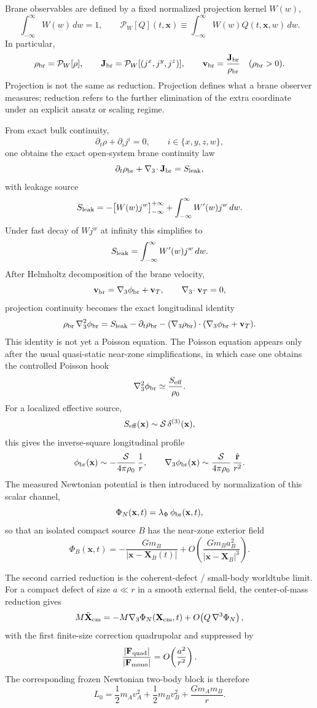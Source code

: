 \documentclass[11pt]{article}
\begin{document}
Brane observables are defined by a fixed normalized projection kernel $W(w)$,
\[
\int_{-\infty}^{\infty}W(w)\,dw=1,
\qquad
\mathcal P_W[Q](t,\mathbf x)
\equiv
\int_{-\infty}^{\infty}W(w)Q(t,\mathbf x,w)\,dw.
\]
In particular,
\[
\rho_{\rm br}=\mathcal P_W[\rho],
\qquad
\mathbf J_{\rm br}=\mathcal P_W[(j^x,j^y,j^z)],
\qquad
\mathbf v_{\rm br}=\frac{\mathbf J_{\rm br}}{\rho_{\rm br}}
\quad (\rho_{\rm br}>0).
\]
Projection is not the same as reduction.  Projection defines what a brane observer
measures; reduction refers to the further elimination of the extra coordinate under an
explicit ansatz or scaling regime.

From exact bulk continuity,
\[
\partial_t\rho+\partial_i j^i=0,
\qquad i\in\{x,y,z,w\},
\]
one obtains the exact open-system brane continuity law
\[
\partial_t\rho_{\rm br}+\nabla_3\!\cdot\mathbf J_{\rm br}=S_{\rm leak},
\]
with leakage source
\[
S_{\rm leak}
=
-\bigl[W(w)j^w\bigr]_{-\infty}^{+\infty}
+
\int_{-\infty}^{\infty}W'(w)j^w\,dw.
\]
Under fast decay of $Wj^w$ at infinity this simplifies to
\[
S_{\rm leak}
=
\int_{-\infty}^{\infty}W'(w)j^w\,dw.
\]
After Helmholtz decomposition of the brane velocity,
\[
\mathbf v_{\rm br}=\nabla_3\phi_{\rm br}+\mathbf v_T,
\qquad
\nabla_3\!\cdot\mathbf v_T=0,
\]
projection continuity becomes the exact longitudinal identity
\[
\rho_{\rm br}\,\nabla_3^2\phi_{\rm br}
=
S_{\rm leak}
-\partial_t\rho_{\rm br}
-(\nabla_3\rho_{\rm br})\cdot(\nabla_3\phi_{\rm br}+\mathbf v_T).
\]
This identity is not yet a Poisson equation.  The Poisson equation appears only after the
usual quasi-static near-zone simplifications, in which case one obtains the controlled
Poisson hook
\[
\nabla_3^2\phi_{\rm br}\simeq \frac{S_{\rm eff}}{\rho_0}.
\]
For a localized effective source,
\[
S_{\rm eff}(\mathbf x)\sim \mathcal S\,\delta^{(3)}(\mathbf x),
\]
this gives the inverse-square longitudinal profile
\[
\phi_{\rm br}(\mathbf x)
\sim
-\frac{\mathcal S}{4\pi\rho_0}\,\frac{1}{r},
\qquad
\nabla_3\phi_{\rm br}(\mathbf x)
\sim
\frac{\mathcal S}{4\pi\rho_0}\,\frac{\hat{\mathbf r}}{r^2}.
\]
The measured Newtonian potential is then introduced by normalization of this scalar
channel,
\[
\Phi_N(\mathbf x,t)=\lambda_\Phi\,\phi_{\rm br}(\mathbf x,t),
\]
so that an isolated compact source $B$ has the near-zone exterior field
\[
\Phi_B(\mathbf x,t)
=
-\frac{Gm_B}{|\mathbf x-\mathbf X_B(t)|}
+O\!\left(\frac{Gm_B a_B^2}{|\mathbf x-\mathbf X_B|^3}\right).
\]

The second carried reduction is the coherent-defect / small-body worldtube limit.  For a
compact defect of size $a\ll r$ in a smooth external field, the center-of-mass reduction
gives
\[
M\ddot{\mathbf X}_{\rm cm}
=
-M\nabla_3\Phi_N(\mathbf X_{\rm cm},t)
+O\!\left(Q\,\nabla^3\Phi_N\right),
\]
with the first finite-size correction quadrupolar and suppressed by
\[
\frac{|\mathbf F_{\rm quad}|}{|\mathbf F_{\rm mono}|}=O\!\left(\frac{a^2}{r^2}\right).
\]
The corresponding frozen Newtonian two-body block is therefore
\[
L_0
=
\frac12m_Av_A^2+\frac12m_Bv_B^2+\frac{Gm_A m_B}{r}.
\]
\end{document}
